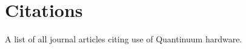 \documentclass[aps, prl, preprintnumbers, twocolumn, superscriptaddress, nofootinbib, floatfix, 10pt]{revtex4-1}
\begin{document}
\section{Citations}

A list of all journal articles citing use of Quantinuum hardware.



\nocite{*}
\end{document}

